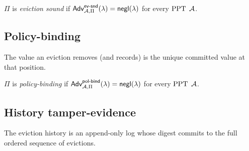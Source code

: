 \begin{definition}\label{def:evsnd}
$\Pi$ is \emph{eviction sound} if $\mathsf{Adv}^{\mathsf{ev\text{-}snd}}_{\mathcal{A},\Pi}(\lambda)=\mathsf{negl}(\lambda)$
for every $\mathrm{PPT}$ $\mathcal{A}$.
\end{definition}

\subsection{Policy-binding}
The value an eviction removes (and records) is the unique committed value at
that position.

\medskip
\noindent{}

\begin{definition}\label{def:polbind}
$\Pi$ is \emph{policy-binding} if $\mathsf{Adv}^{\mathsf{pol\text{-}bind}}_{\mathcal{A},\Pi}(\lambda)=\mathsf{negl}(\lambda)$
for every $\mathrm{PPT}$ $\mathcal{A}$.
\end{definition}

\subsection{History tamper-evidence}
The eviction history is an append-only log whose digest commits to the full
ordered sequence of evictions.

\medskip
\noindent{}

